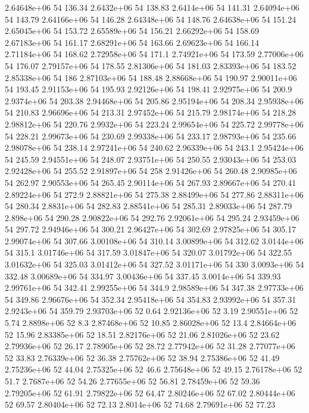 2.64648e+06 54 136.34
2.6432e+06 54 138.83
2.6414e+06 54 141.31
2.64094e+06 54 143.79
2.64166e+06 54 146.28
2.64348e+06 54 148.76
2.64638e+06 54 151.24
2.65045e+06 54 153.72
2.65589e+06 54 156.21
2.66292e+06 54 158.69
2.67183e+06 54 161.17
2.68291e+06 54 163.66
2.69623e+06 54 166.14
2.71184e+06 54 168.62
2.72958e+06 54 171.1
2.74921e+06 54 173.59
2.77006e+06 54 176.07
2.79157e+06 54 178.55
2.81306e+06 54 181.03
2.83393e+06 54 183.52
2.85338e+06 54 186
2.87103e+06 54 188.48
2.88668e+06 54 190.97
2.90011e+06 54 193.45
2.91153e+06 54 195.93
2.92126e+06 54 198.41
2.92975e+06 54 200.9
2.9374e+06 54 203.38
2.94468e+06 54 205.86
2.95194e+06 54 208.34
2.95938e+06 54 210.83
2.96696e+06 54 213.31
2.97452e+06 54 215.79
2.98174e+06 54 218.28
2.98812e+06 54 220.76
2.9932e+06 54 223.24
2.99654e+06 54 225.72
2.99778e+06 54 228.21
2.99673e+06 54 230.69
2.99338e+06 54 233.17
2.98793e+06 54 235.66
2.98078e+06 54 238.14
2.97241e+06 54 240.62
2.96339e+06 54 243.1
2.95424e+06 54 245.59
2.94551e+06 54 248.07
2.93751e+06 54 250.55
2.93043e+06 54 253.03
2.92428e+06 54 255.52
2.91897e+06 54 258
2.91426e+06 54 260.48
2.90985e+06 54 262.97
2.90553e+06 54 265.45
2.90114e+06 54 267.93
2.89667e+06 54 270.41
2.89224e+06 54 272.9
2.88821e+06 54 275.38
2.88499e+06 54 277.86
2.88311e+06 54 280.34
2.8831e+06 54 282.83
2.88541e+06 54 285.31
2.89033e+06 54 287.79
2.898e+06 54 290.28
2.90822e+06 54 292.76
2.92061e+06 54 295.24
2.93459e+06 54 297.72
2.94946e+06 54 300.21
2.96427e+06 54 302.69
2.97825e+06 54 305.17
2.99074e+06 54 307.66
3.00108e+06 54 310.14
3.00899e+06 54 312.62
3.0144e+06 54 315.1
3.01746e+06 54 317.59
3.01847e+06 54 320.07
3.01792e+06 54 322.55
3.01632e+06 54 325.03
3.01412e+06 54 327.52
3.01171e+06 54 330
3.0093e+06 54 332.48
3.00689e+06 54 334.97
3.00436e+06 54 337.45
3.0014e+06 54 339.93
2.99761e+06 54 342.41
2.99255e+06 54 344.9
2.98589e+06 54 347.38
2.97733e+06 54 349.86
2.96676e+06 54 352.34
2.95418e+06 54 354.83
2.93992e+06 54 357.31
2.9243e+06 54 359.79
2.93703e+06 52 0.64
2.92136e+06 52 3.19
2.90551e+06 52 5.74
2.8898e+06 52 8.3
2.87468e+06 52 10.85
2.86028e+06 52 13.4
2.84664e+06 52 15.96
2.83385e+06 52 18.51
2.82176e+06 52 21.06
2.81026e+06 52 23.62
2.79936e+06 52 26.17
2.78905e+06 52 28.72
2.77942e+06 52 31.28
2.77077e+06 52 33.83
2.76339e+06 52 36.38
2.75762e+06 52 38.94
2.75386e+06 52 41.49
2.75236e+06 52 44.04
2.75325e+06 52 46.6
2.75648e+06 52 49.15
2.76178e+06 52 51.7
2.7687e+06 52 54.26
2.77655e+06 52 56.81
2.78459e+06 52 59.36
2.79205e+06 52 61.91
2.79822e+06 52 64.47
2.80246e+06 52 67.02
2.80444e+06 52 69.57
2.80404e+06 52 72.13
2.8014e+06 52 74.68
2.79691e+06 52 77.23
